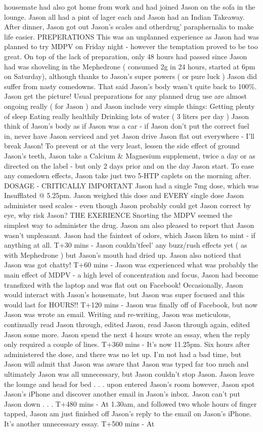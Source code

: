 \documentclass[12pt]{book}
\begin{document}
housemate had also got home from work and had joined Jason on the sofa in the lounge. Jason all had a pint of lager each and Jason had an Indian Takeaway. After dinner, Jason got out Jason's scales and otherdrug' paraphernalia to make life easier. PREPERATIONS This was an unplanned experience as Jason had was planned to try MDPV on Friday night - however the temptation proved to be too great. On top of the lack of preparation, only 48 hours had passed since Jason had was shoveling in the Mephedrone ( consumed 2g in 24 hours, started at 6pm on Saturday), although thanks to Jason's super powers ( or pure luck ) Jason did suffer from nasty comedowns. That said Jason's body wasn't quite back to 100\%. Jason get the picture! Usual preparations for any planned drug use are almost ongoing really ( for Jason ) and Jason include very simple things: Getting plenty of sleep Eating really healthily Drinking lots of water ( 3 liters per day ) Jason think of Jason's body as if Jason was a car - if Jason don't put the correct fuel in, never have Jason serviced and yet Jason drive Jason flat out everywhere - I'll break Jason! To prevent or at the very least, lessen the side effect of ground Jason's teeth, Jason take a Calcium \& Magnesium supplement, twice a day or as directed on the label - but only 2 days prior and on the day Jason start. To ease any comedown effects, Jason take just two 5-HTP caplets on the morning after. DOSAGE - CRITICALLY IMPORTANT Jason had a single 7mg dose, which was Insufflated @ 5.25pm. Jason weighed this dose and EVERY single dose Jason administer used scales - even though Jason probably could get Jason correct by eye, why risk Jason? THE EXERIENCE Snorting the MDPV seemed the simplest way to administer the drug. Jason am also pleased to report that Jason wasn't unpleasant. Jason had the faintest of odors, which Jason liken to mint - if anything at all. T+30 mins - Jason couldn'tfeel' any buzz/rush effects yet ( as with Mephedrone ) but Jason's mouth had dried up. Jason also noticed that Jason was got chatty! T+60 mins - Jason was experienced what was probably the main effect of MDPV - a high level of concentration and focus, Jason had become transfixed with the laptop and was flat out on Facebook! Occasionally, Jason would interact with Jason's housemate, but Jason was super focused and this would last for HOURS!! T+120 mins - Jason was finally off of Facebook, but now Jason was wrote an email. Writing and re-writing, Jason was meticulous, continually read Jason through, edited Jason, read Jason through again, edited Jason some more. Jason spend the next 4 hours wrote an essay, when the reply only required a couple of lines. T+360 mins - It's now 11.25pm. Six hours after administered the dose, and there was no let up. I'm not had a bad time, but Jason will admit that Jason was aware that Jason was typed far too much and ultimately Jason was all unnecessary, but Jason couldn't stop Jason. Jason leave the lounge and head for bed . . .  upon entered Jason's room however, Jason spot Jason's iPhone and discover another email in Jason's inbox. Jason can't put Jason down . . .  T+480 mins - At 1.30am, and followed two whole hours of finger tapped, Jason am just finished off Jason's reply to the email on Jason's iPhone. It's another unnecessary essay. T+500 mins - At 
\end{document}
